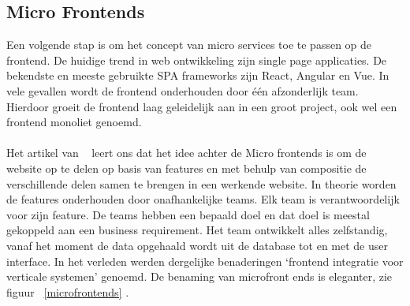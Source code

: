 \subsection{Micro Frontends}
Een volgende stap is om het concept van micro services toe te passen op de frontend. De huidige trend in web ontwikkeling zijn single page applicaties. De bekendste en meeste gebruikte SPA frameworks zijn React, Angular en Vue. In vele gevallen wordt de frontend onderhouden door één afzonderlijk team. Hierdoor groeit de frontend laag geleidelijk aan in een groot project, ook wel een frontend monoliet genoemd.\\\\
Het artikel van ~\autocite{Geers2020} leert ons dat het idee achter de Micro frontends is om de website op te delen op basis van features en met behulp van compositie de verschillende delen samen te brengen in een werkende website. In theorie worden de features onderhouden door onafhankelijke teams. Elk team is verantwoordelijk voor zijn feature. De teams hebben een bepaald doel en dat doel is meestal gekoppeld aan een business requirement. Het team ontwikkelt alles zelfstandig, vanaf het moment de data opgehaald wordt uit de database  tot en met de user interface. In het verleden werden dergelijke benaderingen ‘frontend integratie voor verticale systemen’ genoemd. De benaming van microfront ends is eleganter, zie figuur ~\ref{microfrontends} .

